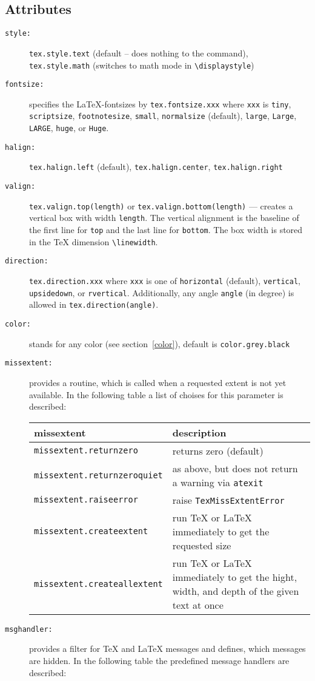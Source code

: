 \subsection{Attributes}
\begin{description}
\item[\texttt{style:}] \verb|tex.style.text| (default -- does nothing to
the command),\\\verb|tex.style.math| (switches to math mode in
\verb|\displaystyle|)
\item[\texttt{fontsize:}] specifies the \LaTeX-fontsizes by
\verb|tex.fontsize.xxx| where \verb|xxx| is
\verb|tiny|,
\verb|scriptsize|,
\verb|footnotesize|,
\verb|small|,
\verb|normalsize| (default),
\verb|large|,
\verb|Large|,
\verb|LARGE|,
\verb|huge|, or
\verb|Huge|.
\item[\texttt{halign:}] \verb|tex.halign.left| (default),
\verb|tex.halign.center|, \verb|tex.halign.right|
\item[\texttt{valign:}] \verb|tex.valign.top(length)| or
\verb|tex.valign.bottom(length)| --- creates a vertical box with width
\verb|length|. The vertical alignment is the baseline of the first line
for \verb|top| and the last line for \verb|bottom|. The box width is
stored in the \TeX{} dimension \verb|\linewidth|.
\item[\texttt{direction:}] \verb|tex.direction.xxx| where \verb|xxx| is
one of \verb|horizontal| (default), \verb|vertical|, \verb|upsidedown|,
or \verb|rvertical|. Additionally, any angle \verb|angle| (in degree) is
allowed in \verb|tex.direction(angle)|.
\item[\texttt{color:}] stands for any \PyX{} color (see
section~\ref{color}), default is \verb|color.grey.black|
\item[\texttt{missextent:}] provides a routine, which is called when a
requested extent is not yet available. In the following table a list
of choises for this parameter is described:

\bigskip
\begin{tabularx}{\linewidth}{l>{\raggedright\arraybackslash}X}
missextent&description\\
\hline
\texttt{missextent.returnzero}&returns zero (default)\\
\texttt{missextent.returnzeroquiet}&as above, but does not return a
warning via \texttt{atexit}\\
\texttt{missextent.raiseerror}&raise \texttt{TexMissExtentError}\\
\texttt{missextent.createextent}&run \TeX{} or \LaTeX{} immediately to
get the requested size\\
\texttt{missextent.createallextent}&run \TeX{} or \LaTeX{} immediately
to get the hight, width, and depth of the given text at once\\
\end{tabularx}
\item[\texttt{msghandler:}] provides a filter for \TeX{} and \LaTeX{}
messages and defines, which messages are hidden. In the following table
the predefined message handlers are described:


\end{description}
